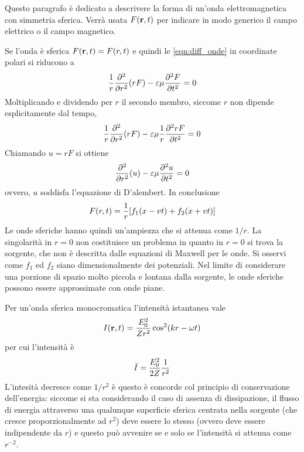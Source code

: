 Questo paragrafo è dedicato a descrivere la forma di un'onda elettromagnetica con simmetria
sferica. Verrà usata $F(\vb{r},t)$ per indicare in modo generico il campo elettrico o il campo
magnetico.

Se l'onda è sferica $F(\vb{r},t)=F(r,t)$ e quindi le \ref{eqn:diff_onde} in coordinate polari
si riducono a
\[
    \frac{1}{r} \pdv[2]{r}(rF)-\varepsilon\mu\pdv[2]{F}{t}=0
\]
Moltiplicando e dividendo per $r$ il secondo membro, siccome $r$ non dipende esplicitamente dal tempo,
\[
    \frac{1}{r} \pdv[2]{r}(rF)-\varepsilon\mu\frac{1}{r}\pdv[2]{rF}{t}=0
\]
Chiamando $u=rF$ si ottiene
\[
    \pdv[2]{r}(u)-\varepsilon\mu\pdv[2]{u}{t}=0
\]
ovvero, $u$ soddisfa l'equazione di D'alembert. In conclusione
\begin{equation}
    F(r,t)=\frac{1}{r}[f_1(x-vt)+f_2(x+vt)]
\end{equation}
Le onde sferiche hanno quindi un'ampiezza che si attenua come $1/r$.
La singolarità in $r=0$ non costituisce un problema in quanto in $r=0$ si trova
la sorgente, che non è descritta dalle equazioni di Maxwell per le onde.
Si osservi come $f_1$ ed $f_2$ siano dimensionalmente dei potenziali.
Nel limite di considerare
una porzione di spazio molto piccola e lontana dalla sorgente, le onde sferiche possono essere
approssimate con onde piane.

Per un'onda sferica monocromatica l'intensità istantanea vale
\[
    I(\vb{r},t)=\frac{E_0^2}{Zr^2}\cos[2](kr-\omega t)
\]
per cui l'intensità è
\[
    \bar{I}=\frac{E_0^2}{2Z}\frac{1}{r^2}
\]
L'intesità decresce come $1/r^2$ è questo è concorde col principio di conservazione dell'energia:
siccome si sta considerando il caso di assenza di dissipazione, il flusso di energia attraverso una
qualunque superficie sferica  centrata nella sorgente (che cresce proporzionalmente ad $r^2$)
deve essere lo stesso (ovvero deve essere indipendente
da $r$) e questo può avvenire se e solo se l'intensità si attenua come $r^{-2}$.
